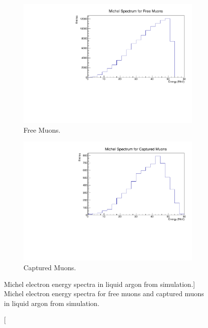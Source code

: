 \begin{figure}

	\centering
	\begin{subfigure}[b]{0.7\textwidth}
		\centering
		\includegraphics[width=\textwidth]{figures/michel_spec_free.pdf}
		\caption {Free Muons.}
		\label{fig:michel_spec_free}
	\end{subfigure}
	\begin{subfigure}[b]{0.7\textwidth}
		\centering
		\includegraphics[width=\textwidth]{figures/michel_spec_cap.pdf}
		\caption {Captured Muons.}
		\label{fig:michel_spec_cap}
	\end{subfigure}

	\caption
	[Michel electron energy spectra in liquid argon from \protodune{} simulation.]
	{Michel electron energy spectra for free muons and captured muons in liquid 
	argon from \protodune{} simulation.}
	\label{fig:michel_spec}

\end{figure}

